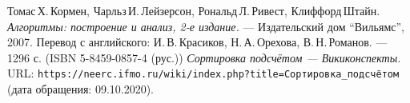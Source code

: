 \begin{thebibliography}{99}
    Томас\,Х.\,Кормен, Чарльз\,И.\,Лейзерсон, Рональд\,Л.\,Ривест, Клиффорд\,Штайн.
    {\itshape Алгоритмы: построение и анализ, 2-е издание.} --- Издательский дом \enquote{Вильямс}, 2007. Перевод с английского: И.\,В.\,Красиков, Н.\,А.\,Орехова, В.\,Н.\,Романов. --- 1296 с. (ISBN 5-8459-0857-4 (рус.))
    {\itshape Сортировка подсчётом — Викиконспекты.} \\URL: \texttt{https://neerc.ifmo.ru/wiki/index.php?title=Сортировка\_подсчётом} (дата обращения: 09.10.2020).
    \end{thebibliography}
    \pagebreak